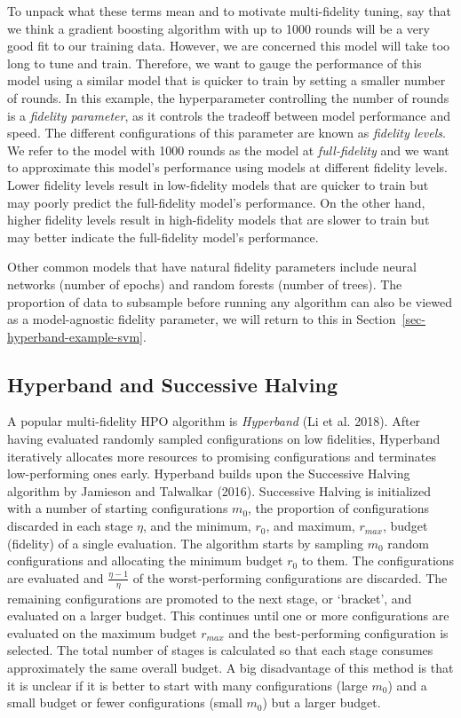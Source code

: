 To unpack what these terms mean and to motivate multi-fidelity tuning,
say that we think a gradient boosting algorithm with up to 1000 rounds
will be a very good fit to our training data. However, we are concerned
this model will take too long to tune and train. Therefore, we want to
gauge the performance of this model using a similar model that is
quicker to train by setting a smaller number of rounds. In this example,
the hyperparameter controlling the number of rounds is a \emph{fidelity
parameter}, as it controls the tradeoff between model performance and
speed. The different configurations of this parameter are known as
\emph{fidelity levels}. We refer to the model with 1000 rounds as the
model at \emph{full-fidelity} and we want to approximate this model's
performance using models at different fidelity levels. Lower fidelity
levels result in low-fidelity models that are quicker to train but may
poorly predict the full-fidelity model's performance. On the other hand,
higher fidelity levels result in high-fidelity models that are slower to
train but may better indicate the full-fidelity model's performance.

Other common models that have natural fidelity parameters include neural
networks (number of epochs) and random
forests (number of trees). The proportion of data
to subsample before running any algorithm can also be viewed as a
model-agnostic fidelity parameter, we will return to this in
Section~\ref{sec-hyperband-example-svm}.

\hypertarget{hyperband-and-successive-halving}{%
\subsection{Hyperband and Successive
Halving}\label{hyperband-and-successive-halving}}

A popular multi-fidelity HPO algorithm is \emph{Hyperband} (Li et al.
2018). After having evaluated randomly sampled configurations on low
fidelities, Hyperband iteratively allocates more
resources to promising configurations and terminates low-performing ones
early. Hyperband builds upon the Successive Halving algorithm by
Jamieson and Talwalkar (2016). Successive Halving is initialized with a
number of starting configurations \(m_0\), the proportion of
configurations discarded in each stage \(\eta\), and the minimum,
\(r{_{0}}\), and maximum, \(r{_{max}}\), budget (fidelity) of a single
evaluation. The algorithm starts by sampling \(m_0\) random
configurations and allocating the minimum budget \(r{_{0}}\) to them.
The configurations are evaluated and \(\frac{\eta - 1}{\eta}\) of the
worst-performing configurations are discarded. The remaining
configurations are promoted to the next stage, or `bracket', and
evaluated on a larger budget. This continues until one or more
configurations are evaluated on the maximum budget \(r{_{max}}\) and the
best-performing configuration is selected. The total number of stages is
calculated so that each stage consumes approximately the same overall
budget. A big disadvantage of this method is that it is unclear if it is
better to start with many configurations (large \(m_0\)) and a small
budget or fewer configurations (small \(m_0\)) but a larger budget.

